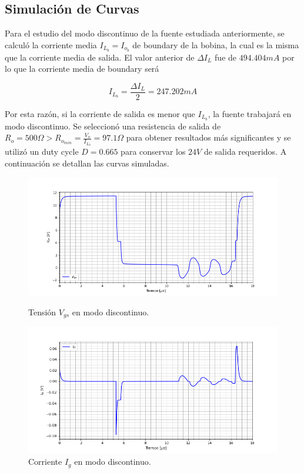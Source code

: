 %

%

\subsection{Simulación de Curvas}

Para el estudio del modo discontinuo de la fuente estudiada anteriormente, se calculó la corriente media $I_{L_b} = I_{o_b}$ de boundary de la bobina, la cual es la misma que la corriente media de salida. El valor anterior de $\Delta I_L$ fue de $494.404mA$ por lo que la corriente media de boundary será

\begin{equation}
I_{L_b} = \frac{\Delta I_L}{2} = 247.202mA
\label{ej4:eq:il_boundary}
\end{equation}

Por esta razón, si la corriente de salida es menor que $I_{L_b}$, la fuente trabajará en modo discontinuo. Se seleccionó una resistencia de salida de $R_o = 500\Omega > R_{o_{min}} = \frac{V_o}{I_{L_b}} = 97.1\Omega$ para obtener resultados más significantes y se utilizó un duty cycle $D = 0.665$ para conservar los $24V$ de salida requeridos. A continuación se detallan las curvas simuladas.

\begin{figure}[H]
	\centering
	\begin{minipage}{0.495\textwidth}
		\centering
		\includegraphics[width=\textwidth]{ImagenesEjercicio-4/vgs}%
		\caption{Tensión $V_{gs}$ en modo discontinuo.}
		\label{ej4:fig:vgs}
	\end{minipage}\hfill
	\begin{minipage}{0.495\textwidth}
		\centering
		\includegraphics[width=\textwidth]{ImagenesEjercicio-4/ig} %
		\caption{Corriente $I_{g}$ en modo discontinuo.}
		\label{ej4:fig:ig}
	\end{minipage}
\end{figure}

